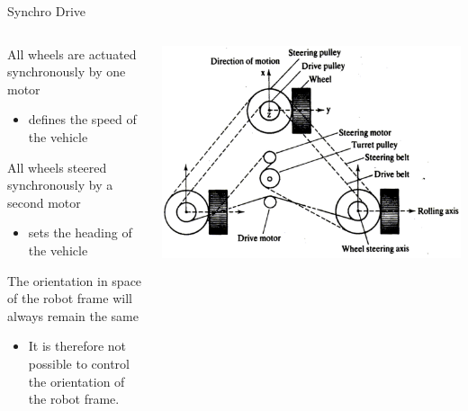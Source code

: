 \documentclass[compress]{beamer}
\begin{document}
\begin{frame}{Synchro Drive}

    \begin{columns}
        \begin{column}{0.6\linewidth}

            All wheels are actuated synchronously by one motor

            \begin{itemize}
                \item defines the speed of the vehicle
            \end{itemize}

            All wheels steered synchronously by a second motor

            \begin{itemize}
                \item sets the heading of the vehicle
            \end{itemize}

            The orientation in space of the robot frame will always remain the same

            \begin{itemize}
                \item It is therefore not possible to control the orientation of the robot
                    frame.
            \end{itemize}
        \end{column}
        \begin{column}{0.4\linewidth}

            \begin{center}
                \includegraphics[width=0.8\linewidth]{synchrodrive}
            \end{center}
        \end{column}
    \end{columns}

\end{frame}
\end{document}
